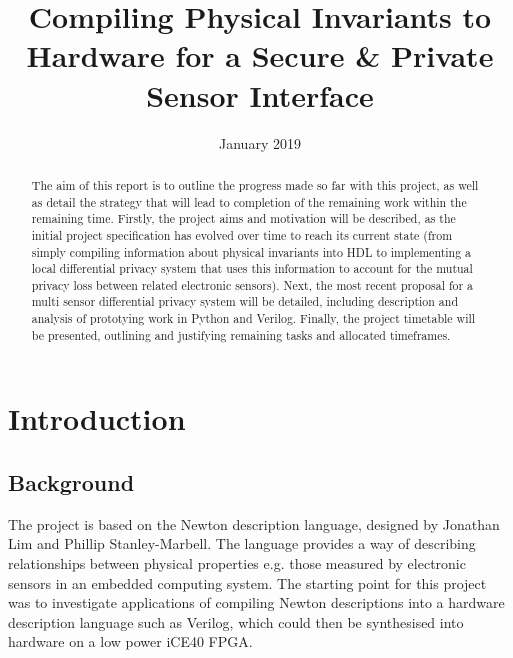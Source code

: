 \documentclass[pageno]{jpaper}
\begin{document}
\title{
Compiling Physical Invariants to Hardware for a Secure \& Private Sensor Interface}

\date{January 2019}
\maketitle

\thispagestyle{empty}

\begin{abstract}

The aim of this report is to outline the progress made so far with this project, as well as detail the strategy that will lead to completion of the remaining work within the remaining time. Firstly, the project aims and motivation will be described, as the initial project specification has evolved over time to reach its current state (from simply compiling information about physical invariants into HDL to implementing a local differential privacy system that uses this information to account for the mutual privacy loss between related electronic sensors). Next, the most recent proposal for a multi sensor differential privacy system will be detailed, including description and analysis of prototying work in Python and Verilog. Finally, the project timetable will be presented, outlining and justifying remaining tasks and allocated timeframes.

\end{abstract}

\section{Introduction}
\subsection{Background}

The project is based on the Newton description language, designed by Jonathan Lim and Phillip Stanley-Marbell\cite{Newton}. The language provides a way of describing relationships between physical properties e.g. those measured by electronic sensors in an embedded computing system. The starting point for this project was to investigate applications of compiling Newton descriptions into a hardware description language such as Verilog, which could then be synthesised into hardware on a low power iCE40\cite{iCE40} FPGA.
\end{document}
